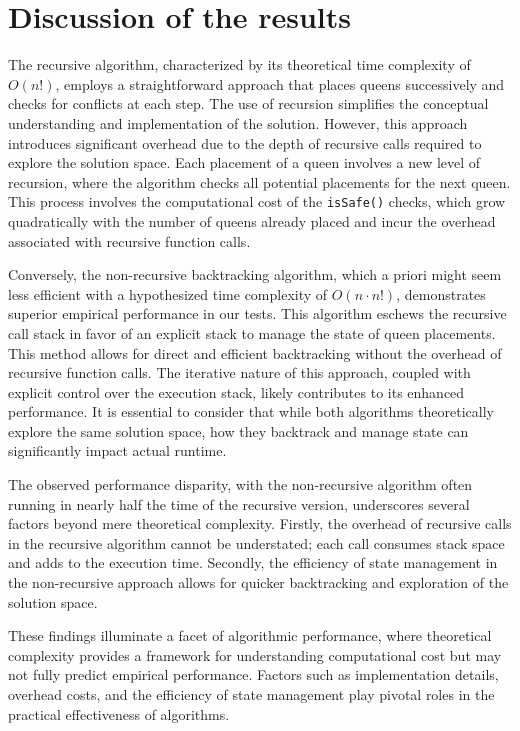 \documentclass{article}
\begin{document}
\section*{Discussion of the results}

The recursive algorithm, characterized by its theoretical time complexity of $O(n!)$, employs a straightforward approach that places queens successively and checks for conflicts at each step. The use of recursion simplifies the conceptual understanding and implementation of the solution. However, this approach introduces significant overhead due to the depth of recursive calls required to explore the solution space. Each placement of a queen involves a new level of recursion, where the algorithm checks all potential placements for the next queen. This process involves the computational cost of the \texttt{isSafe()} checks, which grow quadratically with the number of queens already placed and incur the overhead associated with recursive function calls.

Conversely, the non-recursive backtracking algorithm, which a priori might seem less efficient with a hypothesized time complexity of $O(n \cdot n!)$, demonstrates superior empirical performance in our tests. This algorithm eschews the recursive call stack in favor of an explicit stack to manage the state of queen placements. This method allows for direct and efficient backtracking without the overhead of recursive function calls. The iterative nature of this approach, coupled with explicit control over the execution stack, likely contributes to its enhanced performance. It is essential to consider that while both algorithms theoretically explore the same solution space, how they backtrack and manage state can significantly impact actual runtime.

The observed performance disparity, with the non-recursive algorithm often running in nearly half the time of the recursive version, underscores several factors beyond mere theoretical complexity. Firstly, the overhead of recursive calls in the recursive algorithm cannot be understated; each call consumes stack space and adds to the execution time. Secondly, the efficiency of state management in the non-recursive approach allows for quicker backtracking and exploration of the solution space.

These findings illuminate a facet of algorithmic performance, where theoretical complexity provides a framework for understanding computational cost but may not fully predict empirical performance. Factors such as implementation details, overhead costs, and the efficiency of state management play pivotal roles in the practical effectiveness of algorithms.
\end{document}
